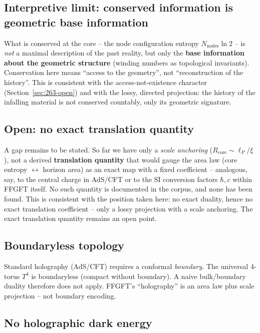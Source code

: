 \subsection*{Interpretive limit: conserved information is geometric base information}

What is conserved at the core -- the node configuration entropy
$N_\text{nodes}\ln 2$ -- is \emph{not} a maximal description of the past
reality, but only the \textbf{base information about the geometric structure}
(winding numbers as topological invariants). Conservation here means
\enquote{access to the geometry}, not \enquote{reconstruction of the
history}. This is consistent with the access-not-existence character
(Section~\ref{sec:263-open}) and with the lossy, directed projection: the
history of the infalling material is not conserved countably, only its
geometric signature.

\subsection*{Open: no exact translation quantity}

A gap remains to be stated. So far we have only a \emph{scale anchoring}
($R_\text{core} \sim \ell_P/\xi$), not a derived \textbf{translation
quantity} that would gauge the area law (core entropy $\leftrightarrow$
horizon area) as an exact map with a fixed coefficient -- analogous, say, to
the central charge in AdS/CFT or to the SI conversion factors $\hbar, c$
within FFGFT itself. No such quantity is documented in the corpus, and none
has been found. This is consistent with the position taken here: no exact
duality, hence no exact translation coefficient -- only a lossy projection
with a scale anchoring. The exact translation quantity remains an open point.



\subsection*{Boundaryless topology}

Standard holography (AdS/CFT) requires a conformal \emph{boundary}. The
universal 4-torus $T^4$ is boundaryless (compact without boundary). A naive
bulk/boundary duality therefore does not apply. FFGFT's
\enquote{holography} is an area law plus scale projection -- not boundary
encoding.

\subsection*{No holographic dark energy}

